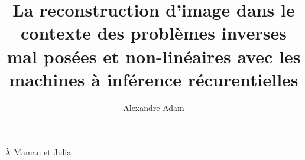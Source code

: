 \documentclass[
  normalmargins,
  11pt,
  openany,
  onehalfspacing,
]{ut-thesis}
\author{Alexandre Adam}
\title{La reconstruction d'image dans le contexte des problèmes inverses mal posées et non-linéaires avec les machines à inférence récurentielles}
\begin{document}
  \frontmatter
    \maketitle

    \begin{resume}
    \end{resume}
    \begin{abstract}
    \end{abstract}

    \tableofcontents
    \listoftables
    \listoffigures
    \printglossaries

        \clearpage
    \begin{dedication}
      À Maman et Julia
    \end{dedication}
    \begin{acknowledgements}
            

           


    \end{acknowledgements}
  \mainmatter
        \glsaddall
    



{\scriptsize
  

}

  \appendix
  
  
  

\end{document}
